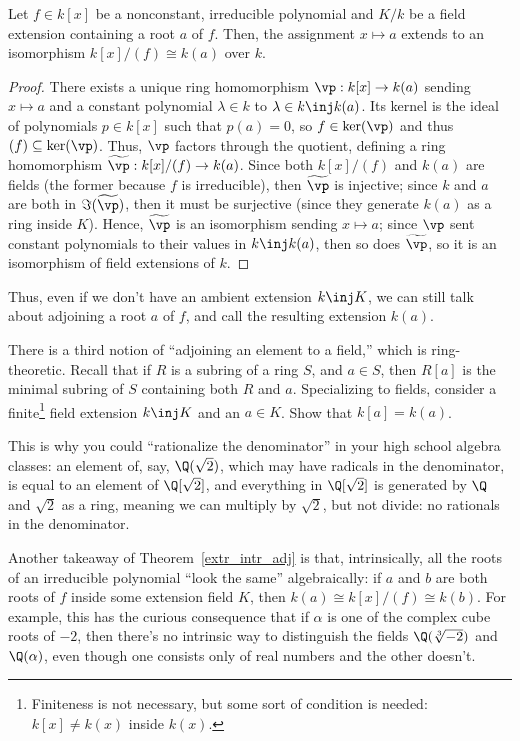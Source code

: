 \begin{thm}
\label{extr_intr_adj}
Let $f\in k[x]$ be a nonconstant, irreducible polynomial and $K/k$ be a field extension containing a root $a$ of
$f$. Then, the assignment $x\mapsto a$ extends to an isomorphism $k[x]/(f)\cong k(a)$ over $k$.
\end{thm}
\begin{proof}
There exists a unique ring homomorphism $\vp:k[x]\to k(a)$ sending $x\mapsto a$ and a constant polynomial
$\lambda\in k$ to $\lambda\in k\inj k(a)$. Its kernel is the ideal of polynomials $p\in k[x]$ such that $p(a) = 0$,
so $f\in\ker(\vp)$ and thus $(f)\subseteq\ker(\vp)$. Thus, $\vp$ factors through the quotient, defining a ring
homomorphism $\widetilde\vp: k[x]/(f)\to k(a)$. Since both $k[x]/(f)$ and $k(a)$ are fields (the former because $f$
is irreducible), then $\widetilde\vp$ is injective; since $k$ and $a$ are both in $\Im(\widetilde\vp)$, then it
must be surjective (since they generate $k(a)$ as a ring inside $K$). Hence, $\widetilde\vp$ is an isomorphism
sending $x\mapsto a$; since $\vp$ sent constant polynomials to their values in $k\inj k(a)$, then so does
$\widetilde\vp$, so it is an isomorphism of field extensions of $k$.
\end{proof}
Thus, even if we don't have an ambient extension $k\inj K$, we can still talk about adjoining a root $a$ of $f$,
and call the resulting extension $k(a)$.
\begin{ex}
\label{Qdenom}
There is a third notion of ``adjoining an element to a field,'' which is ring-theoretic. Recall that if $R$ is a
subring of a ring $S$, and $a\in S$, then $R[a]$ is the minimal subring of $S$ containing both $R$ and $a$.
Specializing to fields, consider a finite\footnote{Finiteness is not necessary, but some sort of condition is
needed: $k[x]\ne k(x)$ inside $k(x)$.} field extension $k\inj K$ and an $a\in K$. Show that $k[a] = k(a)$.
\end{ex}
This is why you could ``rationalize the denominator'' in your high school algebra classes: an element of, say,
$\Q(\sqrt 2)$, which may have radicals in the denominator, is equal to an element of $\Q[\sqrt 2]$, and everything
in $\Q[\sqrt 2]$ is generated by $\Q$ and $\sqrt 2$ as a ring, meaning we can multiply by $\sqrt 2$, but not
divide: no rationals in the denominator.

Another takeaway of Theorem~\ref{extr_intr_adj} is that, intrinsically, all the roots of an irreducible polynomial
``look the same'' algebraically: if $a$ and $b$ are both roots of $f$ inside some extension field $K$, then
$k(a)\cong k[x]/(f)\cong k(b)$. For example, this has the curious consequence that if $\alpha$ is one of the
complex cube roots of $-2$, then there's no intrinsic way to distinguish the fields $\Q(\sqrt[3]{-2})$ and
$\Q(\alpha)$, even though one consists only of real numbers and the other doesn't.

